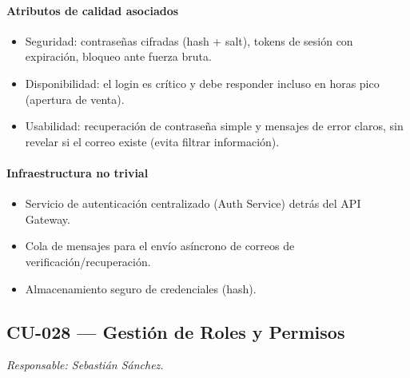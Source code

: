 \paragraph{Atributos de calidad asociados}
\begin{itemize}[leftmargin=1.4em, topsep=1pt]
  \item Seguridad: contraseñas cifradas (hash + salt), tokens de sesión con expiración, bloqueo ante fuerza bruta.
  \item Disponibilidad: el login es crítico y debe responder incluso en horas pico (apertura de venta).
  \item Usabilidad: recuperación de contraseña simple y mensajes de error claros, sin revelar si el correo existe (evita filtrar información).
\end{itemize}

\paragraph{Infraestructura no trivial}
\begin{itemize}[leftmargin=1.4em, topsep=1pt]
  \item Servicio de autenticación centralizado (Auth Service) detrás del API Gateway.
  \item Cola de mensajes para el envío asíncrono de correos de verificación/recuperación.
  \item Almacenamiento seguro de credenciales (hash).
\end{itemize}

\subsection{CU-028 --- Gestión de Roles y Permisos}
\label{cu:cu-028}
\textit{Responsable: Sebastián Sánchez.}

